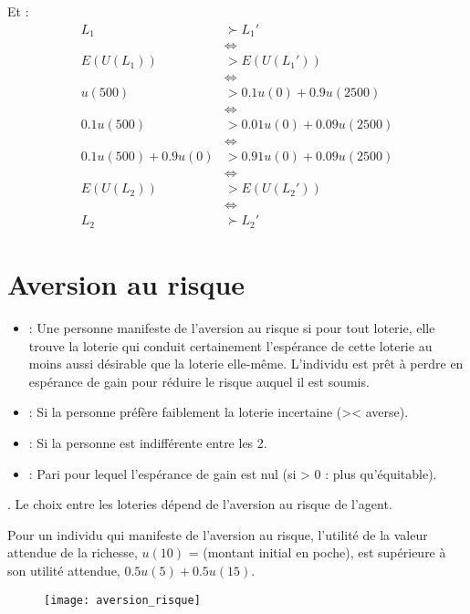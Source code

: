 Et :
\begin{align*}
L_1 &\succ L_1'\\
&\Leftrightarrow\\
E(U(L_1)) &> E(U(L_1'))\\
&\Leftrightarrow\\
u(500) &> 0.1u(0) + 0.9u(2500)\\
&\Leftrightarrow\\
0.1u(500) &> 0.01u(0) + 0.09u(2500)\\
&\Leftrightarrow\\
0.1u(500)+0.9u(0) &> 0.91u(0) + 0.09u(2500)\\
&\Leftrightarrow\\
E(U(L_2)) &> E(U(L_2'))\\
&\Leftrightarrow\\
L_2 &\succ L_2'
\end{align*}

\section{Aversion au risque}

\begin{itemize}
\item {} : Une personne manifeste de l'aversion au risque si pour tout loterie, elle trouve la loterie qui conduit certainement l'espérance de cette loterie au moins aussi désirable que la loterie elle-même. L'individu est prêt à perdre en espérance de gain pour réduire le risque auquel il est soumis.
\item {} : Si la personne préfère faiblement la loterie incertaine (>< averse).
\item {} : Si la personne est indifférente entre les 2.
\item {} : Pari pour lequel l'espérance de gain est nul (si > 0 : plus qu'équitable).
\end{itemize}
\warning {}. Le choix entre les loteries dépend de l'aversion au risque de l'agent.

Pour un individu qui manifeste de l'aversion au risque, l'utilité de la valeur attendue de la richesse, $u(10)$ = (montant initial en poche), est supérieure à son utilité attendue, $0.5u(5) + 0.5u(15)$.
\begin{figure}[H]
	\centering
	\texttt{[image: aversion\_risque]}
\end{figure}

